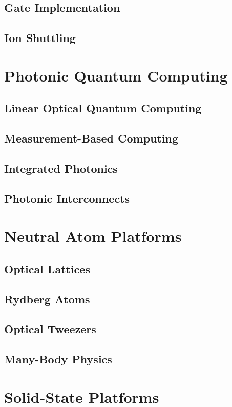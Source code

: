 \documentclass[12pt,a4paper]{book}
\begin{document}
\subsection{Gate Implementation}
\subsection{Ion Shuttling}

\section{Photonic Quantum Computing}
\subsection{Linear Optical Quantum Computing}
\subsection{Measurement-Based Computing}
\subsection{Integrated Photonics}
\subsection{Photonic Interconnects}

\section{Neutral Atom Platforms}
\subsection{Optical Lattices}
\subsection{Rydberg Atoms}
\subsection{Optical Tweezers}
\subsection{Many-Body Physics}

\section{Solid-State Platforms}
\end{document}
